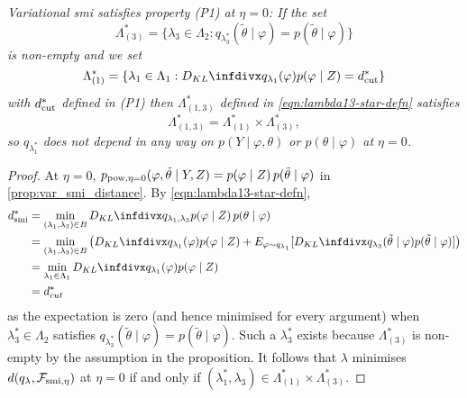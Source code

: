 {\it
Variational \acrshort*{smi} satisfies property (P1) at $\eta=0$: If the set
\[
  \Lambda^*_{(3)}=\{\lambda_3\in \Lambda_2: q_{\lambda^*_3}(\tilde\theta\mid \varphi)=p(\tilde\theta\mid \varphi)\}
\]
is non-empty and we set
\[
  \Lambda^*_{(1)} =   \{\lambda_1\in \Lambda_1:
  \kl{q_{\lambda_1}(\varphi)}{p(\varphi \mid Z)}=d^*_{\cut}\}
\]
with $d^*_{\operatorname{\text{cut}}}$ defined in (P1) then $\Lambda^*_{(1,3)}$ defined in \cref{eqn:lambda13-star-defn} satisfies
\[
  \Lambda^*_{(1,3)} = \Lambda^*_{(1)} \times \Lambda^*_{(3)},
\]
so $q_{\lambda^*_1}$ does not depend in any way on $p(Y \mid \varphi,\theta)$ or $p(\theta \mid \varphi)$ at $\eta=0$.
}
\begin{proof}\label{proof:var_smi_is_cut_at_eta0}
  At $\eta=0$, $p_{\operatorname{\text{pow}}, \eta=0}(\varphi,\tilde\theta \mid Y,Z)=p(\varphi \mid Z)\,p(\tilde\theta\mid \varphi)$ in \cref{prop:var_smi_distance}. By \cref{eqn:lambda13-star-defn},
  \begin{align*}
    d^*_{\smi} & =\min_{(\lambda_1,\lambda_3)\in B}\kl{q_{\lambda_1,\lambda_3}}{p(\varphi \mid Z)\,p(\theta\mid \varphi)}
    \\
               & =\min_{(\lambda_1,\lambda_3)\in B} \left(\kl{q_{\lambda_1}(\varphi)}{p(\varphi \mid Z)}+E_{\varphi\sim q_{\lambda_1}}[\kl{q_{\lambda_3}(\tilde\theta\mid \varphi)}{p(\tilde\theta\mid \varphi)}]\right) \\
               & =\min_{\lambda_1\in \Lambda_1} \kl{q_{\lambda_1}(\varphi)}{p(\varphi \mid Z)}                                                                                                                           \\
               & =d^*_{cut}
  \end{align*}
  as the expectation is zero (and hence minimised for every argument) when $\lambda^*_3\in \Lambda_2$ satisfies $q_{\lambda^*_3}(\tilde\theta\mid \varphi)=p(\tilde\theta\mid \varphi)$. Such a $\lambda^*_3$ exists because $\Lambda^*_{(3)}$ is non-empty by the assumption in the proposition. It follows that $\lambda$ minimises $d(q_\lambda,\mathcal{F}_{\operatorname{\text{smi}}, \eta})$ at $\eta=0$ if and only if $(\lambda^*_1,\lambda_3)\in\Lambda^*_{(1)}\times \Lambda^*_{(3)}$.
\end{proof}

